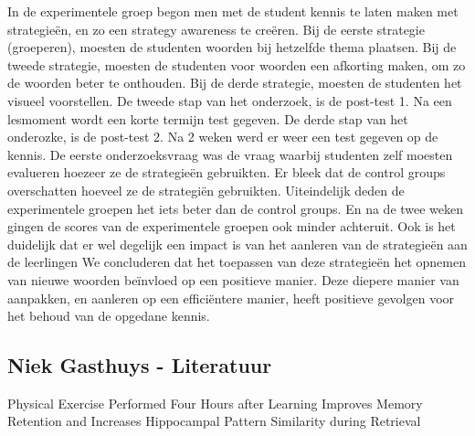 \documentclass{hogent-article}
\begin{document}
	In de experimentele groep begon men met de student kennis te laten maken met strategieën, en zo een strategy awareness te creëren. Bij de eerste strategie (groeperen), moesten de studenten woorden bij hetzelfde thema plaatsen. Bij de tweede strategie, moesten de studenten voor woorden een afkorting maken, om zo de woorden beter te onthouden. Bij de derde strategie, moesten de studenten het visueel voorstellen.
	De tweede stap van het onderzoek, is de post-test 1. Na een lesmoment wordt een korte termijn test gegeven.
	De derde stap van het onderozke, is de post-test 2. Na 2 weken werd er weer een test gegeven op de kennis.
	De eerste onderzoeksvraag was de vraag waarbij studenten zelf moesten evalueren hoezeer ze de strategieën gebruikten. Er bleek dat de control groups overschatten hoeveel ze de strategiën gebruikten. Uiteindelijk deden de experimentele groepen het iets beter dan de control groups. En na de twee weken gingen de scores van de experimentele groepen ook minder achteruit.
	Ook is het duidelijk dat er wel degelijk een impact is van het aanleren van de strategieën aan de leerlingen
	We concluderen dat het toepassen van deze strategieën het opnemen van nieuwe woorden beïnvloed op een positieve manier. Deze diepere manier van aanpakken, en aanleren op een efficiëntere manier, heeft positieve gevolgen voor het behoud van de opgedane kennis.
	
	\subsection{Niek Gasthuys - Literatuur}
	
	Physical Exercise Performed Four Hours after Learning Improves Memory Retention and Increases Hippocampal Pattern Similarity during Retrieval \autocite{Drongen2016}
	
\end{document}
